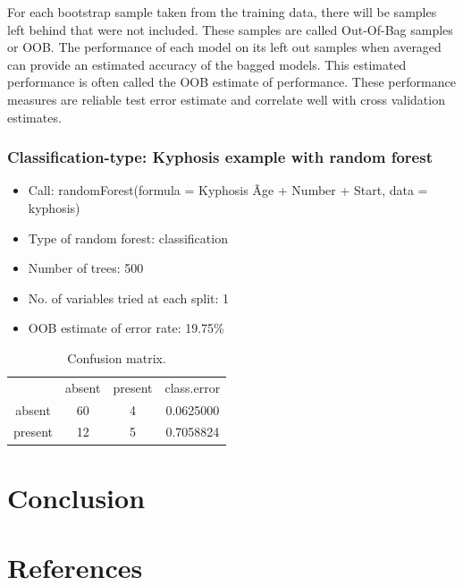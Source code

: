 \documentclass[final, paper=letter,5p,times,twocolumn]{elsarticle}
\begin{document}
For each bootstrap sample taken from the training data, there will be samples left behind that were not included. These samples are called Out-Of-Bag samples or OOB. The performance of each model on its left out samples when averaged can provide an estimated accuracy of the bagged models. This estimated performance is often called the OOB estimate of performance. These performance measures are reliable test error estimate and correlate well with cross validation estimates.

\subsubsection{Classification-type: Kyphosis example with random forest}

\begin{itemize}
\item Call:  randomForest(formula = Kyphosis \~ Age + Number + Start, data = kyphosis) 
\item Type of random forest: classification
\item Number of trees: 500
\item No. of variables tried at each split: 1
\item OOB estimate of  error rate: 19.75\%
\end{itemize}

\begin{table}[]
\begin{tabular}{cccc}
          & absent & present & class.error \\
absent    &   60   &     4   & 0.0625000 \\
present   &   12   &     5   & 0.7058824 \\
\end{tabular}
\caption{Confusion matrix.}
\end{table}

\section{Conclusion}

\lipsum[6-10]

\section*{References}



\end{document}
